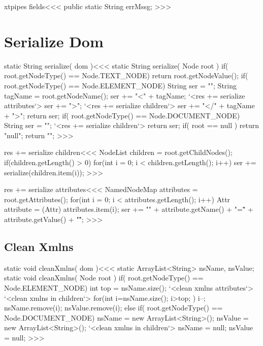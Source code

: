 \documentclass{article}
\begin{document}
\<xtpipes fields\><<<
public static String errMssg;
>>>

\section{Serialize Dom}


\<static String serialize( dom )\><<<
static String serialize( Node root ){
   if( root.getNodeType() == Node.TEXT_NODE) { 
         return root.getNodeValue(); 
   }   
   if( root.getNodeType() == Node.ELEMENT_NODE) { 
      String ser = "";
      String tagName = root.getNodeName();
      ser += "<" + tagName;
      `<res += serialize attributes`>
      ser += "\n>";
      `<res += serialize children`>
      ser += "</" + tagName + ">";
      return ser;
   }
   if( root.getNodeType() == Node.DOCUMENT_NODE) { 
      String ser = "";
      `<res += serialize children`>
      return ser;
   }   
   if( root == null ){ return "null"; }
   return "";
}
>>>

\<res += serialize children\><<<
NodeList children = root.getChildNodes(); 
if(children.getLength() > 0) { 
   for(int i = 0; i < children.getLength(); i++) { 
      ser += serialize(children.item(i)); 
}  } 
>>>

\<res += serialize attributes\><<<
NamedNodeMap attributes = root.getAttributes(); 
for(int i = 0; i < attributes.getLength(); i++) { 
   Attr attribute = (Attr) attributes.item(i); 
   ser += "\n" + attribute.getName() + "=\"" 
               + attribute.getValue() + "\" ";  
}  
>>>




\subsection{Clean Xmlns} 
 
 
\<static void cleanXmlns( dom )\><<< 
static ArrayList<String> nsName, nsValue;
static void cleanXmlns( Node root ){ 
   if( root.getNodeType() == Node.ELEMENT_NODE) {  
      int top = nsName.size();
      `<clean xmlns attributes`> 
      `<clean xmlns in children`> 
       for(int i=nsName.size(); i>top; ){
         i--;
         nsName.remove(i);
         nsValue.remove(i);
       }
   } else if( root.getNodeType() == Node.DOCUMENT_NODE) {  
      nsName = new ArrayList<String>();
      nsValue = new ArrayList<String>();
      `<clean xmlns in children`> 
      nsName = null;
      nsValue = null;
}  } 
>>> 
 
\end{document}
